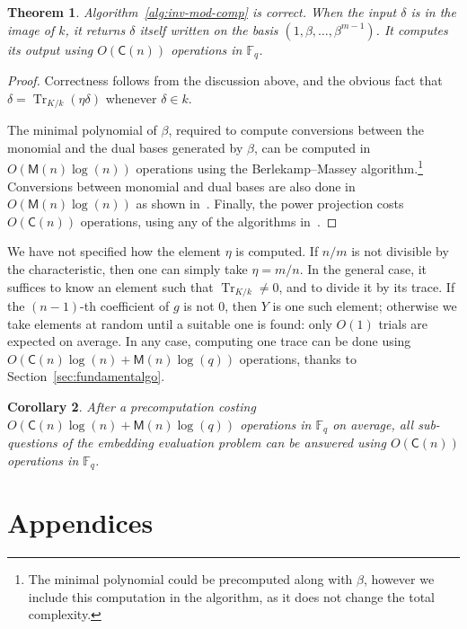 \documentclass[12pt]{article}
\theoremstyle{plain}
\newtheorem{theorem}{Theorem}
\newtheorem{corollary}[theorem]{Corollary}
\theoremstyle{definition}
\DeclareMathOperator{\trace}{Tr} %
\def\F{\ensuremath{\mathbb{F}}}
\def\MM{\ensuremath{\mathsf{M}}}
\def\CC{\ensuremath{\mathsf{C}}}
\newcounter{algorithm}
\begin{document}
\begin{theorem}
  Algorithm~\ref{alg:inv-mod-comp} is correct. %
  When the input $\delta$ is in the image of $k$, it returns $\delta$
  itself written on the basis $(1,\beta,\dots,\beta^{m-1})$. %
  It computes its output using $O(\CC(n))$ operations in $\F_q$.
\end{theorem}
\begin{proof}
  Correctness follows from the discussion above, and the obvious fact
  that $\delta=\trace_{K/k}(\eta\delta)$ whenever $\delta\in k$.

  The minimal polynomial of $\beta$, required to compute conversions
  between the monomial and the dual bases generated by $\beta$, can be
  computed in $O(\MM(n)\log(n))$ operations using the Berlekamp--Massey
  algorithm.\footnote{The minimal polynomial could be precomputed
    along with $\beta$, however we include this computation in the
    algorithm, as it does not change the total complexity.} %
  Conversions between monomial and dual bases are also done in
  $O(\MM(n)\log(n))$ as shown in~\cite[\S~3]{DeDoSc2014}. %
  Finally, the power projection costs $O(\CC(n))$ operations, using
  any of the algorithms in~\cite{shoup95,kedlaya+umans08}.
\end{proof}

We have not specified how the element $\eta$ is computed. %
If $n/m$ is not divisible by the characteristic, then one can simply
take $\eta=m/n$. %
In the general case, it suffices to know an element such that
$\trace_{K/k}\ne0$, and to divide it by its trace. %
If the $(n-1)$-th coefficient of $g$ is not $0$, then $Y$ is one such
element; otherwise we take elements at random until a suitable one is
found: only $O(1)$ trials are expected on average. %
In any case, computing one trace can be done using
$O(\CC(n)\log(n)+\MM(n)\log(q))$ operations, thanks to
Section~\ref{sec:fundamentalgo}.

\begin{corollary}
  After a precomputation costing $O(\CC(n)\log(n)+\MM(n)\log(q))$
  operations in $\F_q$ on average, all sub-questions of the
  \emph{embedding evaluation problem} can be answered using
  $O(\CC(n))$ operations in $\F_q$.
\end{corollary}



\appendix
\part*{Appendices}
\end{document}
